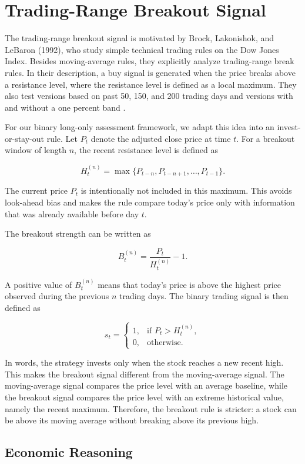 \documentclass[11pt]{article}
\begin{document}
\section{Trading-Range Breakout Signal}

The trading-range breakout signal is motivated by Brock, Lakonishok, and
LeBaron (1992), who study simple technical trading rules on the Dow Jones
Index. Besides moving-average rules, they explicitly analyze trading-range
break rules. In their description, a buy signal is generated when the price
breaks above a resistance level, where the resistance level is defined as a
local maximum. They also test versions based on past 50, 150, and 200 trading
days and versions with and without a one percent band \cite[p.~1736]{brock1992}.

For our binary long-only assessment framework, we adapt this idea into an
invest-or-stay-out rule. Let $P_t$ denote the adjusted close price at time $t$.
For a breakout window of length $n$, the recent resistance level is defined as

\[
H_t^{(n)} = \max\{P_{t-n}, P_{t-n+1}, \ldots, P_{t-1}\}.
\]

The current price $P_t$ is intentionally not included in this maximum. This
avoids look-ahead bias and makes the rule compare today's price only with
information that was already available before day $t$.

The breakout strength can be written as

\[
B_t^{(n)} = \frac{P_t}{H_t^{(n)}} - 1.
\]

A positive value of $B_t^{(n)}$ means that today's price is above the highest
price observed during the previous $n$ trading days. The binary trading signal
is then defined as

\[
s_t =
\begin{cases}
1, & \text{if } P_t > H_t^{(n)}, \\
0, & \text{otherwise.}
\end{cases}
\]

In words, the strategy invests only when the stock reaches a new recent high.
This makes the breakout signal different from the moving-average signal. The
moving-average signal compares the price level with an average baseline, while
the breakout signal compares the price level with an extreme historical value,
namely the recent maximum. Therefore, the breakout rule is stricter: a stock can
be above its moving average without breaking above its previous high.

\subsection*{Economic Reasoning}
\end{document}
